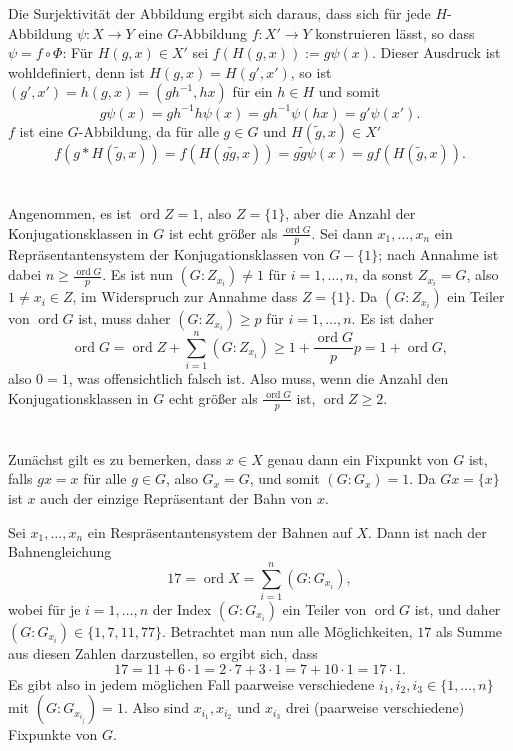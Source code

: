 \documentclass[a4paper,10pt]{article}
\theoremstyle{definition}
\newcommand{\ord}{\operatorname{ord}}
\begin{document}
Die Surjektivität der Abbildung ergibt sich daraus, dass sich für jede $H$-Abbildung $\psi : X \rightarrow Y$ eine $G$-Abbildung $f : X' \rightarrow Y$ konstruieren lässt, so dass $\psi = f \circ \Phi$: Für $H(g,x) \in X'$ sei $f(H(g,x)) :=  g \psi(x)$. Dieser Ausdruck ist wohldefiniert, denn ist $H(g,x) = H(g',x')$, so ist $(g',x') = h(g,x) = (gh^{-1},hx)$ für ein $h \in H$ und somit
\[
 g \psi(x) = g h^{-1} h \psi(x) = g h^{-1} \psi(hx) = g' \psi(x').
\]
$f$ ist eine $G$-Abbildung, da für alle $g \in G$ und $H(\tilde{g},x) \in X'$
\[
 f( g * H(\tilde{g},x) )
 = f( H(g\tilde{g}, x) )
 = g \tilde{g} \psi(x)
 = g f( H(\tilde{g},x) ).
\]





\section{}
Angenommen, es ist $\ord Z = 1$, also $Z = \{1\}$, aber die Anzahl der Konjugationsklassen in $G$ ist echt größer als $\frac{\ord G}{p}$. Sei dann $x_1, \ldots, x_n$ ein Repräsentantensystem der Konjugationsklassen von $G-\{1\}$; nach Annahme ist dabei $n \geq \frac{\ord G}{p}$. Es ist nun $(G : Z_{x_i}) \neq 1$ für $i=1,\ldots,n$, da sonst $Z_{x_i} = G$, also $1 \neq x_i \in Z$, im Widerspruch zur Annahme dass $Z = \{1\}$. Da $(G : Z_{x_i})$ ein Teiler von $\ord G$ ist, muss daher $(G : Z_{x_i}) \geq p$ für $i=1,\ldots,n$. Es ist daher
\[
 \ord G = \ord Z + \sum_{i=1}^n (G : Z_{x_i}) \geq 1 + \frac{\ord G}{p} p = 1 + \ord G,
\]
also $0 = 1$, was offensichtlich falsch ist. Also muss, wenn die Anzahl den Konjugationsklassen in $G$ echt größer als $\frac{\ord G}{p}$ ist, $\ord Z \geq 2$.





\section{}
Zunächst gilt es zu bemerken, dass $x \in X$ genau dann ein Fixpunkt von $G$ ist, falls $gx = x$ für alle $g \in G$, also $G_x = G$, und somit $(G : G_x) = 1$. Da $Gx = \{x\}$ ist $x$ auch der einzige Repräsentant der Bahn von $x$.

Sei $x_1, \ldots, x_n$ ein Respräsentantensystem der Bahnen auf $X$. Dann ist nach der Bahnengleichung
\[
 17 = \ord X = \sum_{i=1}^n (G : G_{x_i}),
\]
wobei für je $i=1, \ldots, n$ der Index $(G : G_{x_i})$ ein Teiler von $\ord G$ ist, und daher $(G : G_{x_i}) \in \{1,7,11,77\}$. Betrachtet man nun alle Möglichkeiten, $17$ als Summe aus diesen Zahlen darzustellen, so ergibt sich, dass
\[
 17
 = 11 + 6 \cdot 1
 = 2 \cdot 7 + 3 \cdot 1
 = 7 + 10 \cdot 1
 = 17 \cdot 1.
\]
Es gibt also in jedem möglichen Fall paarweise verschiedene $i_1, i_2, i_3 \in \{1, \ldots, n\}$ mit $(G : G_{x_{i_j}}) = 1$. Also sind $x_{i_1}, x_{i_2}$ und $x_{i_3}$ drei (paarweise verschiedene) Fixpunkte von $G$.
\end{document}
